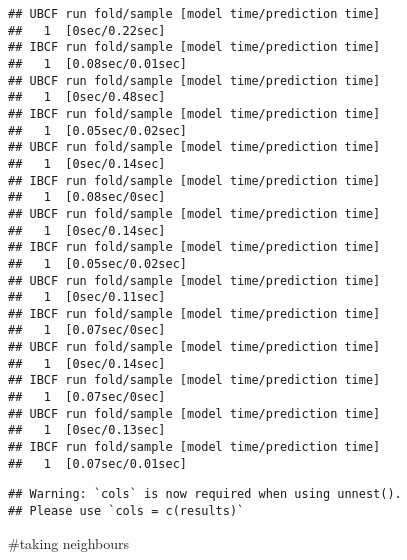 \documentclass[
]{article}
\newenvironment{Shaded}{\begin{snugshade}}{\end{snugshade}}
\newcommand{\DataTypeTok}[1]{\textcolor[rgb]{0.13,0.29,0.53}{#1}}
\newcommand{\DecValTok}[1]{\textcolor[rgb]{0.00,0.00,0.81}{#1}}
\newcommand{\KeywordTok}[1]{\textcolor[rgb]{0.13,0.29,0.53}{\textbf{#1}}}
\newcommand{\NormalTok}[1]{#1}
\newcommand{\OperatorTok}[1]{\textcolor[rgb]{0.81,0.36,0.00}{\textbf{#1}}}
\newcommand{\StringTok}[1]{\textcolor[rgb]{0.31,0.60,0.02}{#1}}
\begin{document}
\begin{Shaded}
\end{Shaded}

\begin{verbatim}
## UBCF run fold/sample [model time/prediction time]
##   1  [0sec/0.22sec] 
## IBCF run fold/sample [model time/prediction time]
##   1  [0.08sec/0.01sec] 
## UBCF run fold/sample [model time/prediction time]
##   1  [0sec/0.48sec] 
## IBCF run fold/sample [model time/prediction time]
##   1  [0.05sec/0.02sec] 
## UBCF run fold/sample [model time/prediction time]
##   1  [0sec/0.14sec] 
## IBCF run fold/sample [model time/prediction time]
##   1  [0.08sec/0sec] 
## UBCF run fold/sample [model time/prediction time]
##   1  [0sec/0.14sec] 
## IBCF run fold/sample [model time/prediction time]
##   1  [0.05sec/0.02sec] 
## UBCF run fold/sample [model time/prediction time]
##   1  [0sec/0.11sec] 
## IBCF run fold/sample [model time/prediction time]
##   1  [0.07sec/0sec] 
## UBCF run fold/sample [model time/prediction time]
##   1  [0sec/0.14sec] 
## IBCF run fold/sample [model time/prediction time]
##   1  [0.07sec/0sec] 
## UBCF run fold/sample [model time/prediction time]
##   1  [0sec/0.13sec] 
## IBCF run fold/sample [model time/prediction time]
##   1  [0.07sec/0.01sec]
\end{verbatim}

\begin{verbatim}
## Warning: `cols` is now required when using unnest().
## Please use `cols = c(results)`
\end{verbatim}

\#taking neighbours
\end{document}
